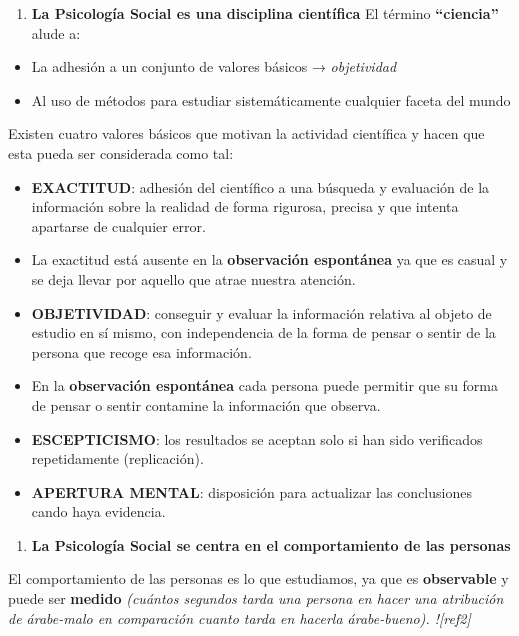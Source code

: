 \documentclass[
]{book}
\providecommand{\tightlist}{%
  \setlength{\itemsep}{0pt}\setlength{\parskip}{0pt}}
\begin{document}
\begin{enumerate}
\def\labelenumi{\arabic{enumi}.}
\tightlist
\item
  \textbf{La Psicología Social es una disciplina científica} El término \textbf{``ciencia''} alude a:
\end{enumerate}

\begin{itemize}
\tightlist
\item
  La adhesión a un conjunto de valores básicos → \emph{objetividad}
\item
  Al uso de métodos para estudiar sistemáticamente cualquier faceta del mundo
\end{itemize}

Existen cuatro valores básicos que motivan la actividad científica y hacen que esta pueda ser considerada como tal:

\begin{itemize}
\tightlist
\item
  \textbf{EXACTITUD}: adhesión del científico a una búsqueda y evaluación de la información sobre la realidad de forma rigurosa, precisa y que intenta apartarse de cualquier error.
\item
  La exactitud está ausente en la \textbf{observación espontánea} ya que es casual y se deja llevar por aquello que atrae nuestra atención.
\item
  \textbf{OBJETIVIDAD}: conseguir y evaluar la información relativa al objeto de estudio en sí mismo, con independencia de la forma de pensar o sentir de la persona que recoge esa información.
\item
  En la \textbf{observación espontánea} cada persona puede permitir que su forma de pensar o sentir contamine la información que observa.
\item
  \textbf{ESCEPTICISMO}: los resultados se aceptan solo si han sido verificados repetidamente (replicación).
\item
  \textbf{APERTURA MENTAL}: disposición para actualizar las conclusiones cando haya evidencia.
\end{itemize}

\begin{enumerate}
\def\labelenumi{\arabic{enumi}.}
\setcounter{enumi}{1}
\tightlist
\item
  \textbf{La Psicología Social se centra en el comportamiento de las personas}
\end{enumerate}

El comportamiento de las personas es lo que estudiamos, ya que es \textbf{observable} y puede ser \textbf{medido} \emph{(cuántos segundos tarda una persona en hacer una atribución de árabe-malo en comparación cuanto tarda en hacerla árabe-bueno). !{[}ref2{]}}
\end{document}
